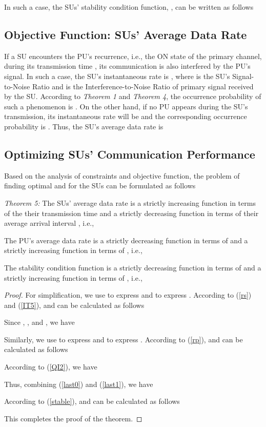 \documentclass[11pt,draftcls]{IEEEtran}{\onecolumn}
\begin{document}
In such a case, the SUs' stability condition function,
, can be written as follows


\subsection{Objective Function: SUs' Average Data Rate}
If a SU encounters the PU's recurrence, i.e., the ON state of the
primary channel, during its transmission time , its
communication is also interfered by the PU's signal. In such a case,
the SU's instantaneous rate is
,
where  is the SU's Signal-to-Noise Ratio and
 is the Interference-to-Noise Ratio of primary signal
received by the SU. According to \emph{Theorem 1} and \emph{Theorem
4}, the occurrence probability of such a phenomenon is
.
On the other hand, if no PU appears during the SU's transmission,
its instantaneous rate will be 
and the corresponding occurrence probability is
. Thus, the SU's average data rate
 is


\subsection{Optimizing SUs' Communication Performance}

Based on the analysis of constraints and objective function, the
problem of finding optimal  and  for the
SUs can be formulated as follows


\emph{Theorem 5:} The SUs' average data rate  is
a strictly increasing function in terms of the their transmission
time  and a strictly decreasing function in terms of their
average arrival interval , i.e.,


The PU's average data rate  is a strictly
decreasing function in terms of  and a strictly increasing
function in terms of , i.e.,


The stability condition function  is a strictly
decreasing function in terms of  and a strictly increasing
function in terms of , i.e.,


\begin{proof}
For simplification, we use  to express
 and  to
express
.
According to (\ref{rs}) and (\ref{IT5}),
 and
 can be calculated as
follows

Since ,
, and
, we have


Similarly, we use  to express
 and  to
express
.
According to (\ref{rp}),  and
 can be calculated as
follows

According to (\ref{QI2}), we have

Thus, combining (\ref{last0}) and (\ref{last1}), we have


According to (\ref{stable}),  and
 can be calculated as
follows

This completes the proof of the theorem.
\end{proof}
\end{document}
